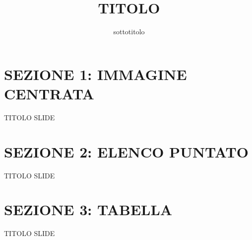 \documentclass[aspectratio=1610]{beamer}
\title{TITOLO}
\subtitle{sottotitolo}
\date{}
\institute{\textit{
        Fonti:
        \begin{itemize}
            \item[-] \href{www.nomefonte1.it}{NOME FONTE 1}
            \item[-] \href{www.nomefonte2.it}{NOME FONTE 2}
        \end{itemize}
    }
}
\begin{document}
\begin{frame}
    \titlepage
\end{frame}

\section{SEZIONE 1: IMMAGINE CENTRATA}

\begin{frame}{TITOLO SLIDE}
\end{frame}

\section{SEZIONE 2: ELENCO PUNTATO}

\begin{frame}{TITOLO SLIDE}
\end{frame}

\section{SEZIONE 3: TABELLA}

\begin{frame}{TITOLO SLIDE}
\end{frame}
\end{document}
